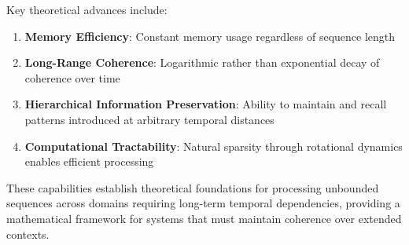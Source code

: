 Key theoretical advances include:

\begin{enumerate}
    \item \textbf{Memory Efficiency}: Constant memory usage regardless of sequence length
    \item \textbf{Long-Range Coherence}: Logarithmic rather than exponential decay of coherence over time
    \item \textbf{Hierarchical Information Preservation}: Ability to maintain and recall patterns introduced at arbitrary temporal distances
    \item \textbf{Computational Tractability}: Natural sparsity through rotational dynamics enables efficient processing
\end{enumerate}

These capabilities establish theoretical foundations for processing unbounded sequences across domains requiring long-term temporal dependencies, providing a mathematical framework for systems that must maintain coherence over extended contexts.
